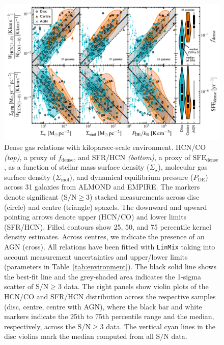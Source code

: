 \documentclass[letter, longauth]{aa} %
\newcommand*{\sigmol}{\ensuremath{\Sigma_{\text{mol}}}\xspace}  %
\newcommand*{\pde}{\ensuremath{P_{\text{DE}}}\xspace}  %
\newcommand*{\fdense}{\ensuremath{f_{\text{dense}}}\xspace}  %
\newcommand*{\sfedense}{\ensuremath{\text{SFE}_{\text{dense}}}\xspace}  %
\newcommand*{\sigstar}{\ensuremath{\Sigma_{\star}}\xspace}  %
\newcommand*{\snr}{\ensuremath{\mathrm{S}/\mathrm{N}}\xspace}  %
\begin{document}
\begin{figure}
\centering
\includegraphics[width=\textwidth]{Figures/HCN_scaling_relations_centre_vs_disc_compressed_v2.pdf}
\caption{Dense gas relations with kiloparsec-scale environment. 
HCN/CO \textit{(top)}, a proxy of \fdense, and SFR/HCN \textit{(bottom)}, a proxy of \sfedense, as a function of stellar mass surface density (\sigstar), molecular gas surface density (\sigmol), and dynamical equilibrium pressure (\pde) across 31 galaxies from ALMOND and EMPIRE.
The markers denote significant ($\snr\geq 3$) stacked measurements across disc (circle) and centre (triangle) spaxels.
The downward and upward pointing arrows denote upper (HCN/CO) and lower limits (SFR/HCN).
Filled contours show 25, 50, and 75 percentile kernel density estimates.
Across centres, we indicate the presence of an AGN (cross).
All relations have been fitted with \texttt{LinMix} taking into account measurement uncertainties and upper/lower limits (parameters in Table~\ref{tab:environment}).
The black solid line shows the best-fit line and the grey-shaded area indicates the 1-sigma scatter of $\snr\geq 3$ data.
The right panels show violin plots of the HCN/CO and SFR/HCN distribution across the respective samples (disc, centre, centre with AGN), where the black bar and white markers indicate the 25th to 75th percentile range and the median, respectively, across the $\snr\geq 3$ data.
The vertical cyan lines in the disc violins mark the median computed from all \snr data.
}
\label{fig:hcn_scaling_relations}
\end{figure}

\end{document}
